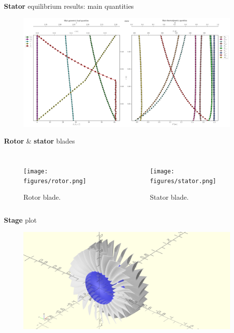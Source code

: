 	\begin{frame}{\textbf{Stator} equilibrium results: main quantities}
		\begin{figure}
			\centering
			\includegraphics[width=1\textwidth]{figures/statorThermo.png}
		\end{figure}
	\end{frame}

	\begin{frame}{\textbf{Rotor} \& \textbf{stator} blades}
		\begin{columns}
				\begin{figure}
					\hspace{-2cm}
					\texttt{[image: figures/rotor.png]}
					\caption{Rotor blade.}
				\end{figure}
				\begin{figure}
					\hspace{-2cm}
					\texttt{[image: figures/stator.png]}
					\caption{Stator blade.}
				\end{figure}
		\end{columns}
	\end{frame}
	\begin{frame}{\textbf{Stage} plot}
		\begin{figure}
			\centering
			\includegraphics[width=1\textwidth]{figures/compressor.png}
		\end{figure}
	\end{frame}
